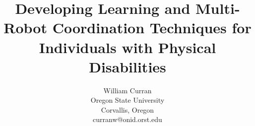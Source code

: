 \documentclass[letterpaper]{article}
\begin{document}

\title{Developing Learning and Multi-Robot Coordination Techniques for Individuals with Physical Disabilities}


\author{William Curran \\
Oregon State University \\
Corvallis, Oregon \\
curranw@onid.orst.edu \\
}

\maketitle
\end{document}
